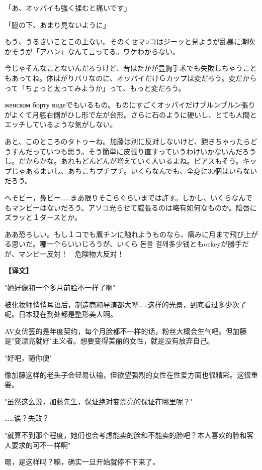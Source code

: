 \documentclass[12pt,UTF8]{ctexbook}
\begin{document}
{{「あ、オッパイも強く揉むと痛いです」

「脇の下、あまり見ないように」

もう、うるさいことこの上ない。そのくせマ○コはジーッと見ようが乱暴に潮吹かそうが「アハン」なんて言ってる。ワケわからない。

今じゃそんなことないんだろうけど、昔はたかが豊胸手术でも失敗しちゃうこともあってね。体はがりバリなのに、オッパイだけＧカップは変だろう。変だからって「ちょっと太ってみようか」って、もっと変だろう。

 женском борту видеでもいるもの。ものにすごくオッパイだけブルンブルン張りがよくて月底右側がひし形で左が台形。さらに石のように硬いし、とても人間とエッチしているような気がしない。

あと、このところのタトゥーね。加藤は別に反対しないけど、飽きちゃったらどうすんだっていつも思う。そう簡単に皮張り直すっていうわけいかないんだろうし。だからかな。あれもどんどんが増えていく人いるよね。ピアスもそう。キップじゃあるまいし、あちこちプチプチ。いくらなんでも、全身に30個はいらないだろう。

へそピー，鼻ピー……まあ限りそこらぐらいまでは許す。しかし、いくらなんでもマンピーはないだろう。アソコ光らせて威張るのは略有如何なものか。陰唇にズラッと１ダースとか。

ああ恐ろしい。もし１コでも鷹チンに触れようものなら、痛みに月まで飛び上がる思いだ。哪一个らいいじろうが、いくら 돈을 걸깨多少钱ともockeyが勝手だが、マンピー反対！　危険物大反対！
}

\vspace{2ex}
\parbox{0.9\linewidth}{
\textbf{【译文】}\par

"她好像和一个多月前脸不一样了啊"

被化妆师悄悄耳语后，制造商和导演都大哗……这样的光景，到底看过多少次了呢。日本现在到处都是整形美人啊。

AV女优签的是年度契约，每个月脸都不一样的话，粉丝大概会生气吧。但加藤是"变漂亮就好"主义者。想要变得美丽的女性，就是没有放弃自己。

"好吧，随你便"

像加藤这样的老头子会轻易认输，但欲望强烈的女性在性爱方面也很精彩。这很重要。

"虽然这么说，加藤先生，保证绝对变漂亮的保证在哪里呢？"

……诶？失败？

"就算不到那个程度，她们也会考虑能卖的脸和不能卖的脸吧？本人喜欢的脸和客人要求的可不一样啊"

嗯，是这样吗？嘛，确实一旦开始就停不下来了。

}}
\end{document}
